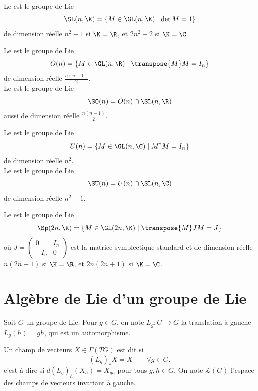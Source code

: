 \begin{definition}
    Le  est le groupe de Lie
    $$\SL(n, \K) = \{ M \in \GL(n, \K) \mid \det M = 1 \}$$
    de dimension réelle $n^2 - 1$ si $\K = \R$, et $2n^2 - 2$ si
  $\K = \C$.
\end{definition}

\begin{definition}
    Le  est le groupe de Lie
    $$O(n) = \{ M \in \GL(n, \R) \mid \transpose{M} M = I_n \}$$
    de dimension réelle $\frac{n(n-1)}{2}$. \\
    Le  est le groupe de Lie 
    $$\SO(n) = O(n) \cap \SL(n, \R)$$ aussi de dimension réelle $\frac{n(n-1)}{2}$.
\end{definition}

\begin{definition}
    Le  est le groupe de Lie
    $$U(n) = \{ M \in \GL(n, \C) \mid M^\dagger M = I_n \}$$
    de dimension réelle $n^2$. \\
    Le  est le groupe de Lie 
    $$\SU(n) = U(n) \cap \SL(n, \C)$$ de dimension réelle $n^2 - 1$.
\end{definition}

\begin{definition}
    Le  est le groupe de Lie
    $$\Sp(2n, \K) = \{ M \in \GL(2n, \K) \mid \transpose{M}JM=J \}$$
    où $J = \begin{pmatrix} 0 & I_n \\ -I_n & 0 \end{pmatrix}$ est la matrice symplectique standard et de dimension réelle $n(2n+1)$ si $\K = \R$, et $2n(2n+1)$ si
  $\K = \C$.
\end{definition}

\section{Algèbre de Lie d'un groupe de Lie}

\noindent Soit $G$ un groupe de Lie. Pour $g \in G$, on note $L_g : G \to G$ la translation à gauche $L_g(h) = gh$, qui est un automorphisme.

\begin{definition}
  Un champ de vecteurs $X \in \Gamma(TG)$ est dit
   si
  $$(L_g)_* X = X \qquad \forall g \in G.$$
  c'est-à-dire si $d(L_g)_h(X_h) = X_{gh}$ pour tous $g, h \in G$.
  On note $\mathcal{L}(G)$ l'espace des champs de vecteurs invariant à gauche.
\end{definition}

